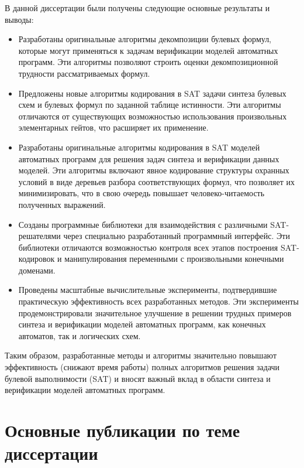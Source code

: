 В данной диссертации были получены следующие основные результаты и выводы:
\begin{itemize}[beginpenalty=10000]
    \item Разработаны оригинальные алгоритмы декомпозиции булевых формул, которые могут применяться к задачам верификации моделей автоматных программ. Эти алгоритмы позволяют строить оценки декомпозиционной трудности рассматриваемых формул.

    \item Предложены новые алгоритмы кодирования в SAT задачи синтеза булевых схем и булевых формул по заданной таблице истинности. Эти алгоритмы отличаются от существующих возможностью использования произвольных элементарных гейтов, что расширяет их применение.

    \item Разработаны оригинальные алгоритмы кодирования в SAT моделей автоматных программ для решения задач синтеза и верификации данных моделей. Эти алгоритмы включают явное кодирование структуры охранных условий в виде деревьев разбора соответствующих формул, что позволяет их минимизировать, что в свою очередь повышает человеко-читаемость полученных выражений.

    \item Созданы программные библиотеки для взаимодействия с различными SAT-решателями через специально разработанный программный интерфейс. Эти библиотеки отличаются возможностью контроля всех этапов построения SAT-кодировок и манипулирования переменными с произвольными конечными доменами.

    \item Проведены масштабные вычислительные эксперименты, подтвердившие практическую эффективность всех разработанных методов. Эти эксперименты продемонстрировали значительное улучшение в решении трудных примеров синтеза и верификации моделей автоматных программ, как конечных автоматов, так и логических схем.
\end{itemize}

Таким образом, разработанные методы и алгоритмы значительно повышают эффективность (снижают время работы) полных алгоритмов решения задачи булевой выполнимости (SAT) и вносят важный вклад в области синтеза и верификации моделей автоматных программ.


\section*{Основные публикации по теме диссертации}

